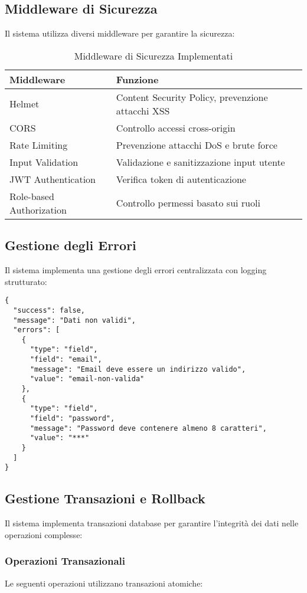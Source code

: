 \subsection{Middleware di Sicurezza}
Il sistema utilizza diversi middleware per garantire la sicurezza:

\begin{table}[H]
\centering
\begin{tabular}{@{}lp{10cm}@{}}
\toprule
\textbf{Middleware} & \textbf{Funzione} \\
\midrule
Helmet & Content Security Policy, prevenzione attacchi XSS \\
CORS & Controllo accessi cross-origin \\
Rate Limiting & Prevenzione attacchi DoS e brute force \\
Input Validation & Validazione e sanitizzazione input utente \\
JWT Authentication & Verifica token di autenticazione \\
Role-based Authorization & Controllo permessi basato sui ruoli \\
\bottomrule
\end{tabular}
\caption{Middleware di Sicurezza Implementati}
\end{table}

\subsection{Gestione degli Errori}
Il sistema implementa una gestione degli errori centralizzata con logging strutturato:

\begin{lstlisting}[caption=Esempio Gestione Errore di Validazione]
{
  "success": false,
  "message": "Dati non validi",
  "errors": [
    {
      "type": "field",
      "field": "email",
      "message": "Email deve essere un indirizzo valido",
      "value": "email-non-valida"
    },
    {
      "type": "field", 
      "field": "password",
      "message": "Password deve contenere almeno 8 caratteri",
      "value": "***"
    }
  ]
}
\end{lstlisting}

\subsection{Gestione Transazioni e Rollback}
Il sistema implementa transazioni database per garantire l'integrità dei dati nelle operazioni complesse:

\subsubsection{Operazioni Transazionali}
Le seguenti operazioni utilizzano transazioni atomiche:

